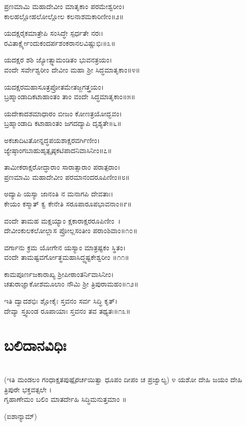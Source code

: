 ಪ್ರಣಮಾಮಿ ಮಹಾದೇವೀಂ ಮಾತೃಕಾಂ ಪರಮೇಶ್ವರೀಂ।\\
ಕಾಲಹಲ್ಲೋಹಲೋಲ್ಲೋಲ ಕಲನಾಶಮಕಾರಿಣೀಂ॥೨॥

ಯದಕ್ಷರೈಕಮಾತ್ರೇಪಿ ಸಂಸಿದ್ಧೇ ಸ್ಪರ್ಧತೇ ನರಃ।\\
ರವಿತಾರ್ಕ್ಷ್ಯೇಂದುಕಂದರ್ಪಶಂಕರಾನಲವಿಷ್ಣುಭಿಃ॥೩॥

ಯದಕ್ಷರ ಶಶಿ ಜ್ಯೋತ್ಸ್ನಾಮಂಡಿತಂ ಭುವನತ್ರಯಂ।\\
ವಂದೇ ಸರ್ವೇಶ್ವರೀಂ ದೇವೀಂ ಮಹಾ ಶ್ರೀ ಸಿದ್ಧಮಾತೃಕಾಂ॥೪॥

ಯದಕ್ಷರಮಹಾಸೂತ್ರಪ್ರೋತಮೇತಜ್ಜಗತ್ತ್ರಯಂ।\\
ಬ್ರಹ್ಮಾಂಡಾದಿಕಟಾಹಾಂತಂ ತಾಂ ವಂದೇ ಸಿದ್ಧಮಾತೃಕಾಂ॥೫॥

ಯದೇಕಾದಶಮಾಧಾರಂ ಬೀಜಂ ಕೋಣತ್ರಯೋದ್ಭವಂ।\\
ಬ್ರಹ್ಮಾಂಡಾದಿ ಕಟಾಹಾಂತಂ ಜಗದದ್ಯಾಪಿ ದೃಶ್ಯತೇ॥೬॥

ಅಕಚಾದಿಟತೋನ್ನದ್ಧಪಯಶಾಕ್ಷರವರ್ಗಿಣೀಂ।\\
ಜ್ಯೇಷ್ಠಾಂಗಬಾಹುಹೃತ್ಪೃಷ್ಠಕಟಿಪಾದನಿವಾಸಿನೀಂ॥೭॥

ತಾಮೀಕರಾಕ್ಷರೋದ್ಧಾರಾಂ ಸಾರಾತ್ಸಾರಾಂ ಪರಾತ್ಪರಾಂ।\\
ಪ್ರಣಮಾಮಿ ಮಹಾದೇವೀಂ ಪರಮಾನಂದರೂಪಿಣೀಂ॥೮॥

ಅದ್ಯಾಪಿ ಯಸ್ಯಾ ಜಾನಂತಿ ನ ಮನಾಗಪಿ ದೇವತಾಃ।\\
ಕೇಯಂ ಕಸ್ಮಾತ್ ಕ್ವ ಕೇನೇತಿ ಸರೂಪಾರೂಪಭಾವನಾಂ॥೯॥

ವಂದೇ ತಾಮಹ ಮಕ್ಷಯ್ಯಾಂ ಕ್ಷಕಾರಾಕ್ಷರರೂಪಿಣೀಂ~।\\
ದೇವೀಂಕುಲಕಲೋಲ್ಲಾಸ ಪ್ರೋಲ್ಲಸಂತೀಂ ಪರಾಂಶಿವಾಂ॥೧೦॥

ವರ್ಗಾನು ಕ್ರಮ ಯೋಗೇನ ಯಸ್ಯಾಂ ಮಾತ್ರಷ್ಟಕಂ ಸ್ಥಿತಂ।\\
ವಂದೇ ತಾಮಷ್ಟವರ್ಗೋತ್ಥಮಹಾಸಿದ್ಧ್ಯಷ್ಟಕೇಶ್ವರೀಂ ॥೧೧॥

ಕಾಮಪೂರ್ಣಜಕಾರಾಖ್ಯ ಶ್ರೀಪೀಠಾಂತರ್ನಿವಾಸಿನೀಂ।\\
ಚತುರಾಜ್ಞಾಕೋಶಮೂಲಾಂ ನೌಮಿ ಶ್ರೀ ತ್ರಿಪುರಾಮಹಂ॥೧೨॥

ಇತಿ ದ್ವಾದಶಭಿಃ ಶ್ಲೋಕೈಃ ಸ್ತವನಂ ಸರ್ವ ಸಿದ್ಧಿ ಕೃತ್।\\
ದೇವ್ಯಾ ಸ್ತ್ವಖಂಡ ರೂಪಾಯಾಃ ಸ್ತವನಂ ತವ ತಥ್ಯತಃ॥೧೩॥
\section{ಬಲಿದಾನವಿಧಿಃ}
\\ (ಇತಿ ಮಂಡಲಂ ಗಂಧಾಕ್ಷತಪುಷ್ಪೈರರ್ಚಯಿತ್ವಾ ಧೂಪಂ ದೀಪಂ ಚ ಪ್ರಜ್ವಾಲ್ಯ)
\newpage
೪ ಯಶೋ ದೇಹಿ ಜಯಂ ದೇಹಿ ತ್ರಿಪುರೇ ಭಕ್ತವತ್ಸಲೇ ।\\ ಗೃಹಾಣೇಮಂ ಬಲಿಂ ಮಾತರ್ದೇಹಿ ಸಿದ್ಧಿಮನುತ್ತಮಾಂ ॥

(ಐಶಾನ್ಯಾಮ್)\\

